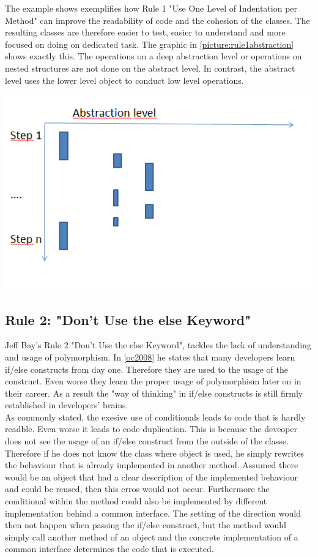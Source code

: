 The example shows exemplifies how Rule 1 "Use One Level of Indentation per Method" can improve the readability of code and the cohesion of the classes. The resulting classes are therefore easier to test, easier to understand and more focused on doing on dedicated task. The graphic in \ref{picture:rule1abstraction} shows exactly this. The operations on a deep abstraction level or operations on nested structures are not done on the abstract level. In contrast, the abstract level uses the lower level object to conduct low level operations. 

\includegraphics{Bilder/Rule1Abstraction.PNG}
\label{picture:rule1abstraction}

\subsection{Rule 2: "Don’t Use the else Keyword"}
\label{describe:rule2}
Jeff Bay's Rule 2 "Don’t Use the else Keyword", tackles the lack of understanding and usage of polymorphism. 
In \ref{oc2008} he states that many developers learn if/else constructs from day one. Therefore they are used to the usage of the construct. Even worse they learn the proper usage of polymorphism later on in their career. As a result the "way of thinking" in if/else constructs is still firmly established in developers' brains.
\\

As commonly stated, the exesive use of conditionals leads to code that is hardly readble. Even worse it leads to code duplication. This is because the deveoper does not see the usage of an if/else construct from the outside of the classe. Therefore if he does not know the class where object is used, he simply rewrites the behaviour that is already implemented in another method. Assumed there would be an object that had a clear description of the implemented behaviour and could be reused, then this erros would not occur. Furthermore the conditional within the method could also be implemented by different implementation behind a common interface. The setting of the direction would then not happen when passing the if/else construct, but the method would simply call another method of an object and the concrete implementation of a common interface determines the code that is executed. 
\\

